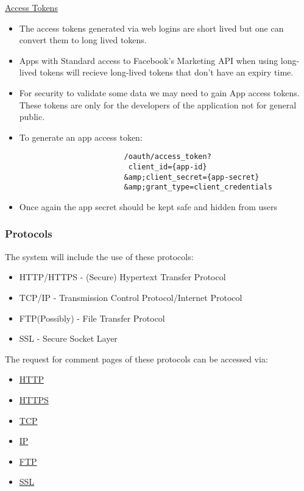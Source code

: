 \documentclass{article}
\begin{document}
			\href{https://developers.facebook.com/docs/facebook-login/access-tokens}{Access Tokens}
			\begin{itemize}
				\item The access tokens generated via web logins are short lived but one can convert them to long lived tokens.
				\item Apps with Standard access to Facebook's Marketing API when using long-lived tokens will recieve long-lived tokens that don't have an expiry time.
				\item For security to validate some data we may need to gain App access tokens. These tokens are only for the developers of the application not for general public.
				\item To generate an app access token:
					\begin{verbatim}
						/oauth/access_token?
					     client_id={app-id}
					    &amp;client_secret={app-secret}
					    &amp;grant_type=client_credentials
					\end{verbatim}
				\item Once again the app secret should be kept safe and hidden from users
			\end{itemize}

		\subsubsection{Protocols}
		The system will include the use of these protocols:
		\begin{itemize}
			\item HTTP/HTTPS - (Secure) Hypertext Transfer Protocol
			\item TCP/IP - Transmission Control Protocol/Internet Protocol
			\item FTP(Possibly) - File Transfer Protocol
			\item SSL - Secure Socket Layer 
		\end{itemize}
		The request for comment pages of these protocols can be accessed via:
		\begin{itemize}
			\item\href{https://tools.ietf.org/html/rfc2616}{HTTP}
			\item\href{https://tools.ietf.org/html/rfc2660}{HTTPS}
			\item\href{https://www.ietf.org/rfc/rfc793.txt}{TCP}
			\item\href{http://www.ietf.org/rfc/rfc0791.txt}{IP}
			\item\href{https://www.ietf.org/rfc/rfc959.txt}{FTP}
			\item\href{https://tools.ietf.org/html/rfc6101}{SSL}
		\end{itemize}
\end{document}
